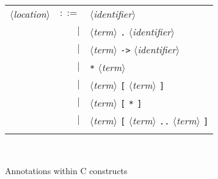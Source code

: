 \documentclass[12pt,a4paper,twoside,openright]{report}
\newcommand{\te}[1]{\texttt{#1}}
\newcommand{\nt}[1]{$\langle$\textsl{#1}$\rangle$}
\begin{document}
\begin{figure}[htbp]
\begin{center}
\begin{tabular}{lrl}
  \nt{location}
    & $::=$ & \nt{identifier} \\
    &   $|$ & \nt{term} \te{.} \nt{identifier} \\
    &   $|$ & \nt{term} \te{->} \nt{identifier} \\
    &   $|$ & \te{*} \nt{term} \\
    &   $|$ & \nt{term} \te{[} \nt{term} \te{]} \\
    &   $|$ & \nt{term} \te{[} \te{*} \te{]} \\
    &   $|$ & \nt{term} \te{[} \nt{term} \te{..} \nt{term} \te{]} \\
  \\[0.1em]
\end{tabular}\\
\hrulefill
\caption{Annotations within C constructs}
\label{fig:cfiles}
\end{center}           
\end{figure}
\end{document}
